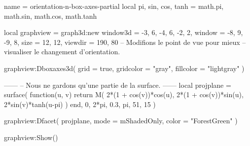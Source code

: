 \documentclass{standalone}
\begin{document}
\begin{luadraw}{name = orientation-n-box-axes-partial}
local pi, sin, cos, tanh = math.pi, math.sin, math.cos, math.tanh

local graphview = graph3d:new{
  window3d = {-3, 6, -4, 6, -2, 2},
  window   = {-8, 9, -9, 8},
  size     = {12, 12},
  viewdir  = {190, 80}  -- Modifions le point de vue pour mieux
                        -- visualiser le changement d'orientation.
}

graphview:Dboxaxes3d({
  grid      = true,
  gridcolor = "gray",
  fillcolor = "lightgray"
})

------
-- Nous ne gardons qu'une partie de la surface.
------
local projplane = surface(
  function(u, v)
    return M(
      2*(1 + cos(v))*cos(u),
      2*(1 + cos(v))*sin(u),
      2*sin(v)*tanh(u-pi)
    )
  end,
  0, 2*pi, 0.3, pi,
  {51, 15}
)

graphview:Dfacet(
  projplane,
  {
    mode  = mShadedOnly,
    color = "ForestGreen"
  }
)

graphview:Show()
\end{luadraw}
\end{document}
